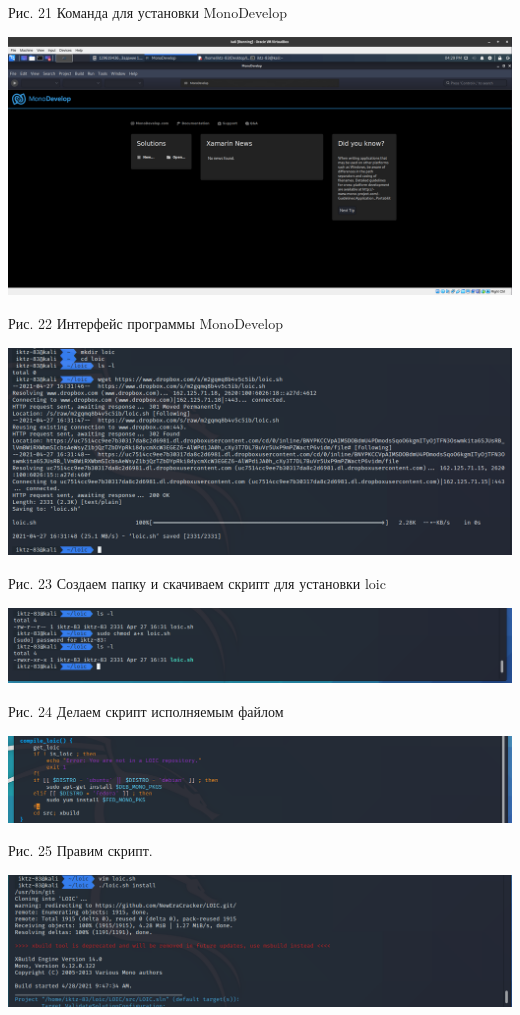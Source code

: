 \documentclass[a4paper,14pt]{extarticle}
\begin{document}
\begin{center}
        Рис. 21 Команда для установки MonoDevelop

        \includegraphics[scale=0.26]{pics/22.png}

        Рис. 22 Интерфейс программы MonoDevelop

        \includegraphics[scale=0.42]{pics/23.png}

        Рис. 23 Создаем папку и скачиваем скрипт для установки loic 

        \includegraphics[scale=0.4]{pics/24.png}

        Рис. 24 Делаем скрипт исполняемым файлом

        \includegraphics[scale=0.4]{pics/25.png}

        Рис. 25 Правим скрипт.

        \includegraphics[scale=0.4]{pics/26.png}


\end{center}
\end{document}
